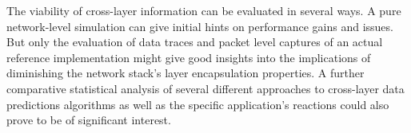 The viability of cross-layer information can be evaluated in several ways. A pure network-level simulation can give initial hints on performance gains and issues. But only the evaluation of data traces and packet level captures of an actual reference implementation might give good insights into the implications of diminishing the network stack's layer encapsulation properties. A further comparative statistical analysis of several different approaches to cross-layer data predictions algorithms as well as the specific application's reactions could also prove to be of significant interest.













